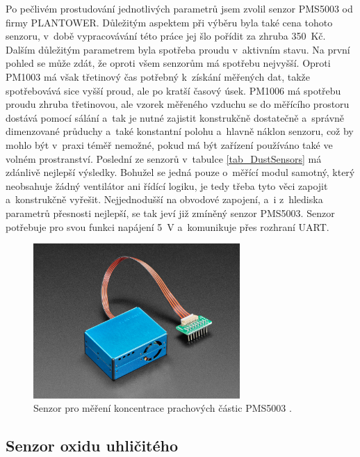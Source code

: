 Po pečlivém prostudování jednotlivých parametrů jsem zvolil senzor PMS5003 od firmy PLANTOWER. Důležitým aspektem při výběru byla také cena tohoto senzoru, v~době vypracovávání této práce jej šlo pořídit za zhruba 350~Kč. Dalším důležitým parametrem byla spotřeba proudu v~aktivním stavu. Na první pohled se může zdát, že oproti všem senzorům má spotřebu nejvyšší. Oproti PM1003 má však třetinový čas potřebný k~získání měřených dat, takže spotřebovává sice vyšší proud, ale po kratší časový úsek. PM1006 má spotřebu proudu zhruba třetinovou, ale vzorek měřeného vzduchu se do měřícího prostoru dostává pomocí sálání a~tak je nutné zajistit konstrukčně dostatečně a~správně dimenzované průduchy a~také konstantní polohu a~hlavně náklon senzoru, což by mohlo být v~praxi téměř nemožné, pokud má být zařízení používáno také ve volném prostranství. Poslední ze senzorů v~tabulce \ref{tab_DustSensors} má zdánlivě nejlepší výsledky. Bohužel se jedná pouze o~měřící modul samotný, který neobsahuje žádný ventilátor ani řídící logiku, je tedy třeba tyto věci zapojit a~konstrukčně vyřešit. Nejjednodušší na obvodové zapojení, a~i z~hlediska parametrů přesnosti nejlepší, se tak jeví již zmíněný senzor PMS5003. Senzor potřebuje pro svou funkci napájení \SI{5}{\volt} a~komunikuje přes rozhraní UART.

\begin{figure}
    \centering
    \includegraphics[width=0.7\textwidth]{obrazky/PMS5003.jpg}
    \caption[Senzor pro měření koncentrace prachových částic PMS5003.]{Senzor pro měření koncentrace prachových částic PMS5003 \cite{dat_PMS5003}.}
    \label{fig_PMS5003}
\end{figure}

\subsection{Senzor oxidu uhličitého}

